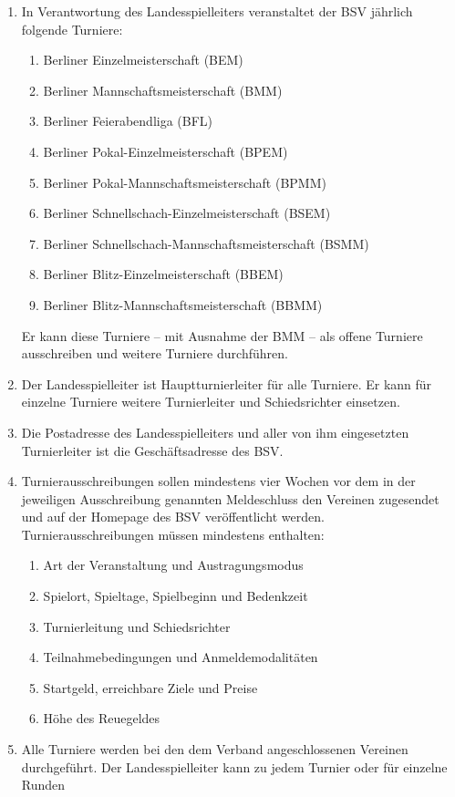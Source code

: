 \documentclass[fontsize=12pt, paper=a4, ngerman]{article}
\begin{document}
\begin{enumerate}
\item In Verantwortung des Landesspielleiters veranstaltet der BSV jährlich folgende Turniere:
  \begin{enumerate}[label=\alph*.]
  \item Berliner Einzelmeisterschaft (BEM)
  \item Berliner Mannschaftsmeisterschaft (BMM)
  \item Berliner Feierabendliga (BFL)
  \item Berliner Pokal-Einzelmeisterschaft (BPEM)
  \item Berliner Pokal-Mannschaftsmeisterschaft (BPMM)
  \item Berliner Schnellschach-Einzelmeisterschaft (BSEM)
  \item Berliner Schnellschach-Mannschaftsmeisterschaft (BSMM)
  \item Berliner Blitz-Einzelmeisterschaft (BBEM)
  \item Berliner Blitz-Mannschaftsmeisterschaft (BBMM)
  \end{enumerate}
  Er kann diese Turniere -- mit Ausnahme der BMM -- als offene Turniere ausschreiben und weitere Turniere durchführen.
\item Der Landesspielleiter ist Hauptturnierleiter für alle Turniere. Er kann für einzelne Turniere weitere Turnierleiter und Schiedsrichter einsetzen.
\item Die Postadresse des Landesspielleiters und aller von ihm eingesetzten Turnierleiter ist die Geschäftsadresse des BSV.
\item Turnierausschreibungen sollen mindestens vier Wochen vor dem in der jeweiligen Ausschreibung genannten Meldeschluss den Vereinen zugesendet und auf der
Homepage des BSV veröffentlicht werden. Turnierausschreibungen müssen mindestens enthalten:
  \begin{enumerate}[label=\alph*.]
  \item Art der Veranstaltung und Austragungsmodus
  \item Spielort, Spieltage, Spielbeginn und Bedenkzeit
  \item Turnierleitung und Schiedsrichter
  \item Teilnahmebedingungen und Anmeldemodalitäten
  \item Startgeld, erreichbare Ziele und Preise
  \item Höhe des Reuegeldes
  \end{enumerate}
\item Alle Turniere werden bei den dem Verband angeschlossenen Vereinen durchgeführt. Der Landesspielleiter kann zu jedem Turnier oder für einzelne Runden

\end{enumerate}
\end{document}
